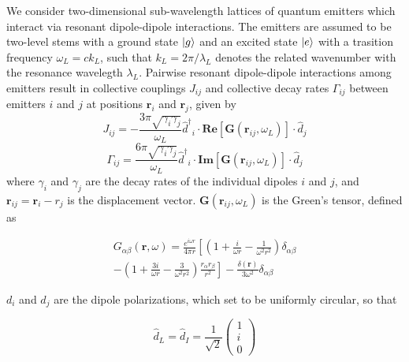 \documentclass[aps,pra,superscriptaddress,twocolumn]{revtex4-1}
\newcommand{\rr}{\mathbf{r}}
\begin{document}
We consider two-dimensional sub-wavelength lattices of quantum emitters which interact via resonant dipole-dipole interactions. The emitters are assumed to be two-level stems with a ground state $\ket{g}$ and an excited state $\ket{e}$ with a trasition frequency $\omega_L = c k_L$, such that $k_L = 2\pi/\lambda_L$ denotes the related wavenumber with the resonance wavelegth $\lambda_L$. Pairwise resonant dipole-dipole interactions among emitters result in collective couplings $J_{ij}$ and collective decay rates $\Gamma_{ij}$ between emitters $i$ and $j$ at positions $\rr_i$ and $\rr_j$, given by 
\begin{equation} J_{ij} = -\frac{3\pi \sqrt{\gamma_i \gamma_j}}{\omega_L} {\hat{d}^\dagger}_i \cdot \textbf{Re} [\textbf{G}(\textbf{r}_{ij}, \omega_L)] \cdot \hat{d}_j 
\label{eqn:J} \end{equation}
\begin{equation} \Gamma_{ij} = \frac{6\pi \sqrt{\gamma_i \gamma_j}}{\omega_L} {\hat{d}^\dagger}_i \cdot \textbf{Im} [\textbf{G}(\textbf{r}_{ij},\omega_L)] \cdot \hat{d}_j 
\label{eqn:Gamma} \end{equation}
where $\gamma_i$ and $\gamma_j$ are the decay rates of the individual dipoles $i$ and $j$, and $\rr_{ij} = \rr_i - r_j$ is the displacement vector. $\textbf{G}(\textbf{r}_{ij}, \omega_L)$ is the Green's tensor, defined as 

\begin{multline} 
    G_{\alpha\beta} (\textbf{r}, \omega) = \frac{e^{i\omega r}}{4\pi r} \left[ \left( 1 + \frac{i}{\omega r} - \frac{1}{\omega^2 r^2} \right) \delta_{\alpha\beta}
    \right. \\ \left. 
    - \left( 1 + \frac{3i}{\omega r} - \frac{3}{\omega^2 r^2} \right) \frac{r_\alpha r_\beta}{r^2} \right] - \frac{\delta(\textbf{r})}{3\omega^2} \delta_{\alpha\beta} 
    \label{eqn:Green}
\end{multline}

$d_i$ and $d_j$ are the dipole polarizations, which set to be uniformly circular, so that 

\begin{equation} 
    \hat{d}_L = \hat{d}_I = \frac{1}{\sqrt{2}} \begin{pmatrix}
    1 \\ i \\ 0
    \end{pmatrix} 
    \label{eqn:polarization}
\end{equation}
\end{document}
